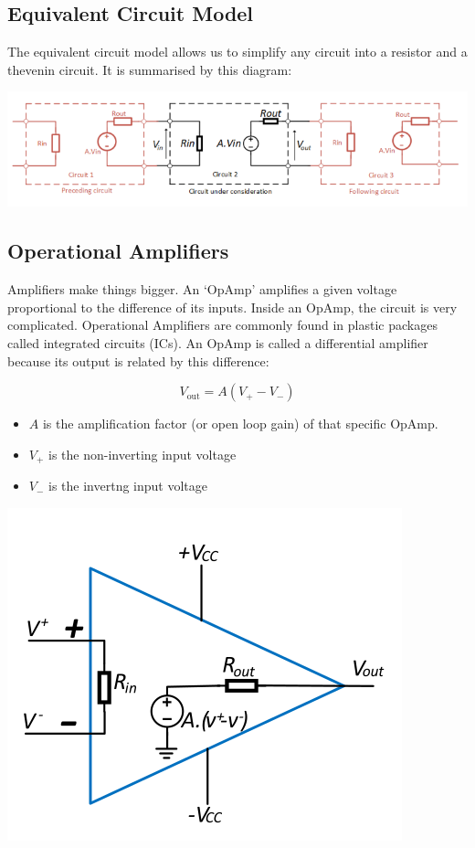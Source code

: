\documentclass[12pt]{article}
\begin{document}
\subsection{Equivalent Circuit Model}
The equivalent circuit model allows us to simplify any circuit into a resistor and a thevenin circuit.
It is summarised by this diagram:

\begin{center}
  \includegraphics[scale=0.3]{equivalent}
\end{center}

\subsection{Operational Amplifiers}
Amplifiers make things bigger.
An `OpAmp' amplifies a given voltage proportional to the difference of its inputs.
Inside an OpAmp, the circuit is very complicated.
Operational Amplifiers are commonly found in plastic packages called integrated circuits (ICs).
An OpAmp is called a differential amplifier because its output is related by this difference:

\begin{equation*}
  V_{\text{out}} = A(V_+ - V_-)
\end{equation*}

\begin{itemize}
  \item $A$ is the amplification factor (or open loop gain) of that specific OpAmp. 
  \item $V_+$ is the non-inverting input voltage 
  \item $V_-$ is the invertng input voltage
\end{itemize}

\begin{marginfigure}
  \includegraphics[scale=0.3]{opamp}
\end{marginfigure}
\end{document}
